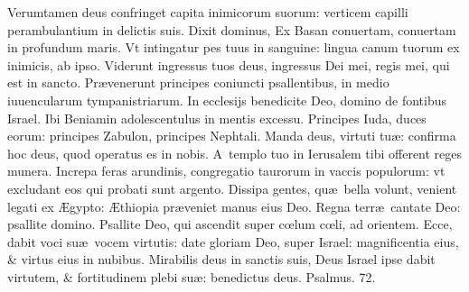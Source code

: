 \documentclass[a5paper,10pt]{book}
\def\ae{æ}
\def\AE{Æ}
\def\oe{œ}
\begin{document}
\begin{multicols*}{2}
\newline \color{red} V\color{black}erumtamen deus confringet capita inimicorum suorum: verticem capilli perambulantium in delictis suis.
\newline \color{red} D\color{black}ixit dominus, Ex Basan conuertam, conuertam in profundum maris.
\newline \color{red} V\color{black}t intingatur pes tuus in sanguine: lingua canum tuorum ex inimicis, ab ipso.
\newline \color{red} V\color{black}iderunt ingressus tuos deus, ingressus Dei mei, regis mei, qui est in sancto.
\newline \color{red} P\color{black}r\ae venerunt principes coniuncti psallentibus, in medio iuuencularum tympanistriarum.
\newline \color{red} I\color{black}n ecclesijs benedicite Deo, domino de fontibus Israel.
\newline \color{red} I\color{black}bi Beniamin adolescentulus in mentis excessu.
\newline \color{red} P\color{black}rincipes Iuda, duces eorum: principes Zabulon, principes Nephtali.
\newline \color{red} M\color{black}anda deus, virtuti tu\ae : confirma hoc deus, quod operatus es in nobis.
\newline \color{red} A\color{black}\ templo tuo in Ierusalem tibi offerent reges munera.
\newline \color{red} I\color{black}ncrepa feras arundinis, congregatio taurorum in vaccis populorum: vt excludant eos qui probati sunt argento.
\newline \color{red} D\color{black}issipa gentes, qu\ae \ bella volunt, venient legati ex \AE gypto: \AE thiopia pr\ae veniet manus eius Deo.
\newline \color{red} R\color{black}egna terr\ae \ cantate Deo: psallite domino.
\newline \color{red} P\color{black}sallite Deo, qui ascendit super c\oe lum c\oe li, ad orientem.
\newline \color{red} E\color{black}cce, dabit voci su\ae \ vocem virtutis: date gloriam Deo, super Israel: magnificentia eius, \& virtus eius in nubibus.
\newline \color{red} M\color{black}irabilis deus in sanctis suis, Deus Israel ipse dabit virtutem, \& fortitudinem plebi su\ae : benedictus deus.
\newline \color{red} Psalmus. \hypertarget{ps72}{72.} \color{black}%
\vspace{-.5em}

\end{multicols*}
\end{document}
